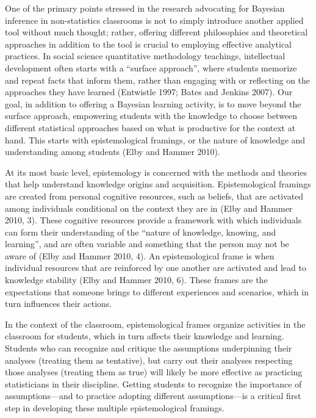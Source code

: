 \documentclass[
  12pt,
  letterpaper,
  DIV=11,
  numbers=noendperiod]{scrartcl}
\begin{document}
One of the primary points stressed in the research advocating for
Bayesian inference in non-statistics classrooms is not to simply
introduce another applied tool without much thought; rather, offering
different philosophies and theoretical approaches in addition to the
tool is crucial to employing effective analytical practices. In social
science quantitative methodology teachings, intellectual development
often starts with a ``surface approach'', where students memorize and
repeat facts that inform them, rather than engaging with or reflecting
on the approaches they have learned (Entwistle 1997; Bates and Jenkins
2007). Our goal, in addition to offering a Bayesian learning activity,
is to move beyond the surface approach, empowering students with the
knowledge to choose between different statistical approaches based on
what is productive for the context at hand. This starts with
epistemological framings, or the nature of knowledge and understanding
among students (Elby and Hammer 2010).

At its most basic level, epistemology is concerned with the methods and
theories that help understand knowledge origins and acquisition.
Epistemological framings are created from personal cognitive resources,
such as beliefs, that are activated among individuals conditional on the
context they are in (Elby and Hammer 2010, 3). These cognitive resources
provide a framework with which individuals can form their understanding
of the ``nature of knowledge, knowing, and learning'', and are often
variable and something that the person may not be aware of (Elby and
Hammer 2010, 4). An epistemological frame is when individual resources
that are reinforced by one another are activated and lead to knowledge
stability (Elby and Hammer 2010, 6). These frames are the expectations
that someone brings to different experiences and scenarios, which in
turn influences their actions.

In the context of the classroom, epistemological frames organize
activities in the classroom for students, which in turn affects their
knowledge and learning. Students who can recognize and critique the
assumptions underpinning their analyses (treating them as tentative),
but carry out their analyses respecting those analyses (treating them as
true) will likely be more effective as practicing statisticians in their
discipline. Getting students to recognize the importance of
assumptions---and to practice adopting different assumptions---is a
critical first step in developing these multiple epistemological
framings.
\end{document}
